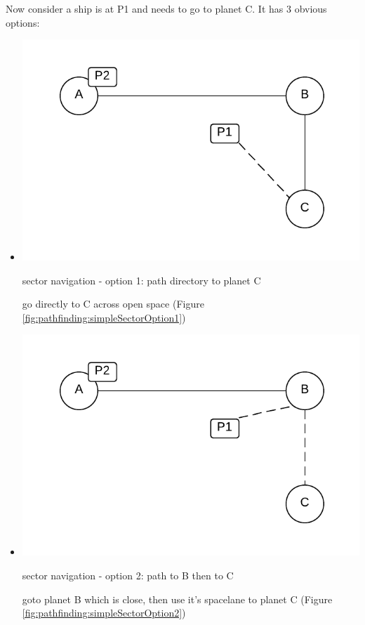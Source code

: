 Now consider a ship is at P1 and needs to go to planet C.
It has 3 obvious options:
\begin{itemize}
\item 
\begin{marginfigure}
	\includegraphics{res/pathfinding/PathFindingSectorOption1.pdf}
    \caption{sector navigation - option 1: path directory to planet C}
	\label{fig:pathfinding:simpleSectorOption1}
\end{marginfigure}
go directly to C across open space (Figure \ref{fig:pathfinding:simpleSectorOption1})

\item 
\begin{marginfigure}
	\includegraphics{res/pathfinding/PathFindingSectorOption2.pdf}
    \caption{sector navigation - option 2: path to B then to C}
	\label{fig:pathfinding:simpleSectorOption2}
\end{marginfigure}
goto planet B which is close, then use it's spacelane to planet C (Figure \ref{fig:pathfinding:simpleSectorOption2})


\end{itemize}
